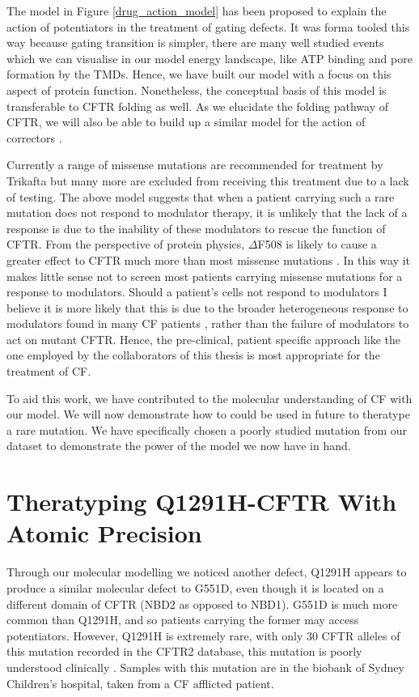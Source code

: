 The model in Figure \ref {drug_action_model} has been proposed to explain the action of potentiators in the treatment of gating defects. It was forma tooled this way because gating transition is simpler, there are many well studied events which we can visualise in our model energy landscape, like ATP binding and pore formation by the TMDs. Hence, we have built our model with a focus on this aspect of protein function. Nonetheless, the conceptual basis of this model is transferable to CFTR folding as well. As we elucidate the folding pathway of CFTR, we will also be able to build up a similar model for the action of correctors \cite{krainer2018, kleizen2021, kleizen2020, fiedorczuk2022}. 

Currently a range of missense mutations are recommended for treatment by Trikafta but many more are excluded from receiving this treatment due to a lack of testing. The above model suggests that when a patient carrying such a rare mutation does not respond to modulator therapy, it is unlikely that the lack of a response is due to the inability of these modulators to rescue the function of CFTR. From the perspective of protein physics, $\Delta$F508 is likely to cause a greater effect to CFTR much more than most missense mutations \cite{bahia2021}. In this way it makes little sense not to screen most patients carrying missense mutations for a response to modulators. Should a patient's cells not respond to modulators I believe it is more likely that this is due to the broader heterogeneous response to modulators found in many CF patients \cite{boyle2014, donaldson2018, keating2018, matthes2018}, rather than the failure of modulators to act on mutant CFTR. Hence, the pre-clinical, patient specific approach like the one employed by the collaborators of this thesis is most appropriate for the treatment of CF. 

To aid this work, we have contributed to the molecular understanding of CF with our model. We will now demonstrate how to could be used in future to theratype a rare mutation. We have specifically chosen a poorly studied mutation from our dataset to demonstrate the power of the model we now have in hand. 

\section{Theratyping Q1291H-CFTR With Atomic Precision}

Through our molecular modelling we noticed another defect, Q1291H appears to produce a similar molecular defect to G551D, even though it is located on a different domain of CFTR (NBD2 as opposed to NBD1). G551D is much more common than Q1291H, and so patients carrying the former may access potentiators. However, Q1291H is extremely rare, with only 30 CFTR alleles of this mutation recorded in the CFTR2 database, this mutation is poorly understood clinically \cite{cftr2}. Samples with this mutation are in the biobank of Sydney Children's hospital, taken from a CF afflicted patient. 

